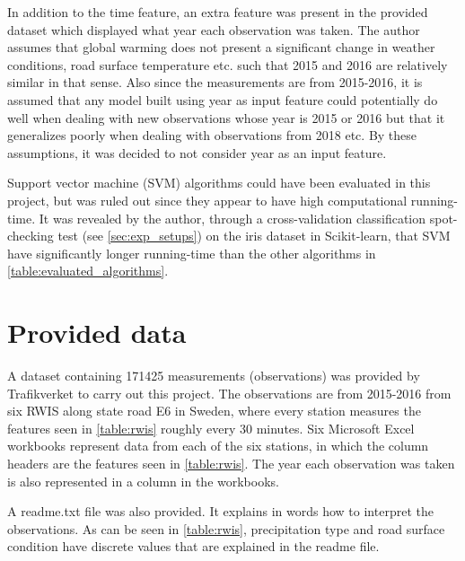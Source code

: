 	In addition to the time feature, an extra feature was present in the provided dataset which displayed what year each observation was taken. The author assumes that global warming does not present a significant change in weather conditions, road surface temperature etc. such that 2015 and 2016 are relatively similar in that sense. Also since the measurements are from 2015-2016, it is assumed that any model built using year as input feature could potentially do well when dealing with new observations whose year is 2015 or 2016 but that it generalizes poorly when dealing with observations from 2018 etc. By these assumptions, it was decided to not consider year as an input feature. 

	Support vector machine (SVM) algorithms could have been evaluated in this project, but was ruled out since they appear to have high computational running-time. It was revealed by the author, through a cross-validation classification spot-checking test (see \ref{sec:exp_setups}) on the iris dataset in Scikit-learn, that SVM have significantly longer running-time than the other algorithms in \ref{table:evaluated_algorithms}.


\section{Provided data} \label{sec:provided_data}
	A dataset containing 171425 measurements (observations) was provided by Trafikverket to carry out this project. The observations are from 2015-2016 from six RWIS along state road E6 in Sweden, where every station measures the features seen in \ref{table:rwis} roughly every 30 minutes. Six Microsoft Excel workbooks represent data from each of the six stations, in which the column headers are the features seen in \ref{table:rwis}. The year each observation was taken is also represented in a column in the workbooks.

	A readme.txt file was also provided. It explains in words how to interpret the observations. As can be seen in \ref{table:rwis}, precipitation type and road surface condition have discrete values that are explained in the readme file.
		
